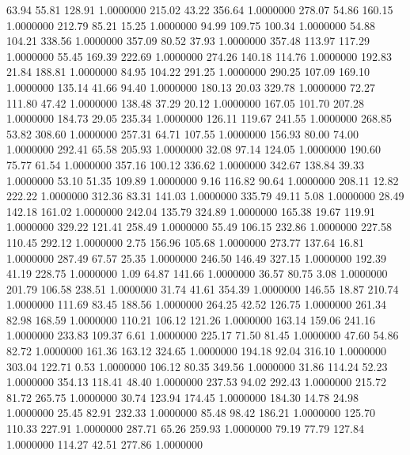   63.94   55.81  128.91   1.0000000
 215.02   43.22  356.64   1.0000000
 278.07   54.86  160.15   1.0000000
 212.79   85.21   15.25   1.0000000
  94.99  109.75  100.34   1.0000000
  54.88  104.21  338.56   1.0000000
 357.09   80.52   37.93   1.0000000
 357.48  113.97  117.29   1.0000000
  55.45  169.39  222.69   1.0000000
 274.26  140.18  114.76   1.0000000
 192.83   21.84  188.81   1.0000000
  84.95  104.22  291.25   1.0000000
 290.25  107.09  169.10   1.0000000
 135.14   41.66   94.40   1.0000000
 180.13   20.03  329.78   1.0000000
  72.27  111.80   47.42   1.0000000
 138.48   37.29   20.12   1.0000000
 167.05  101.70  207.28   1.0000000
 184.73   29.05  235.34   1.0000000
 126.11  119.67  241.55   1.0000000
 268.85   53.82  308.60   1.0000000
 257.31   64.71  107.55   1.0000000
 156.93   80.00   74.00   1.0000000
 292.41   65.58  205.93   1.0000000
  32.08   97.14  124.05   1.0000000
 190.60   75.77   61.54   1.0000000
 357.16  100.12  336.62   1.0000000
 342.67  138.84   39.33   1.0000000
  53.10   51.35  109.89   1.0000000
   9.16  116.82   90.64   1.0000000
 208.11   12.82  222.22   1.0000000
 312.36   83.31  141.03   1.0000000
 335.79   49.11    5.08   1.0000000
  28.49  142.18  161.02   1.0000000
 242.04  135.79  324.89   1.0000000
 165.38   19.67  119.91   1.0000000
 329.22  121.41  258.49   1.0000000
  55.49  106.15  232.86   1.0000000
 227.58  110.45  292.12   1.0000000
   2.75  156.96  105.68   1.0000000
 273.77  137.64   16.81   1.0000000
 287.49   67.57   25.35   1.0000000
 246.50  146.49  327.15   1.0000000
 192.39   41.19  228.75   1.0000000
   1.09   64.87  141.66   1.0000000
  36.57   80.75    3.08   1.0000000
 201.79  106.58  238.51   1.0000000
  31.74   41.61  354.39   1.0000000
 146.55   18.87  210.74   1.0000000
 111.69   83.45  188.56   1.0000000
 264.25   42.52  126.75   1.0000000
 261.34   82.98  168.59   1.0000000
 110.21  106.12  121.26   1.0000000
 163.14  159.06  241.16   1.0000000
 233.83  109.37    6.61   1.0000000
 225.17   71.50   81.45   1.0000000
  47.60   54.86   82.72   1.0000000
 161.36  163.12  324.65   1.0000000
 194.18   92.04  316.10   1.0000000
 303.04  122.71    0.53   1.0000000
 106.12   80.35  349.56   1.0000000
  31.86  114.24   52.23   1.0000000
 354.13  118.41   48.40   1.0000000
 237.53   94.02  292.43   1.0000000
 215.72   81.72  265.75   1.0000000
  30.74  123.94  174.45   1.0000000
 184.30   14.78   24.98   1.0000000
  25.45   82.91  232.33   1.0000000
  85.48   98.42  186.21   1.0000000
 125.70  110.33  227.91   1.0000000
 287.71   65.26  259.93   1.0000000
  79.19   77.79  127.84   1.0000000
 114.27   42.51  277.86   1.0000000

